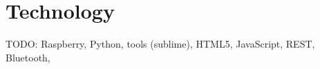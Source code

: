 \section{Technology}

TODO: Raspberry, Python, tools (sublime), HTML5, JavaScript, REST, Bluetooth,
